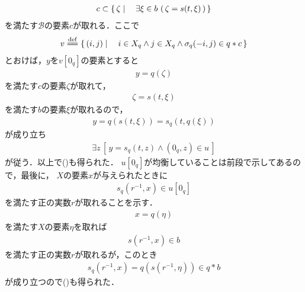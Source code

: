 \begin{sketch}
\begin{description}
\begin{align}
					c \subset \left\{\, \zeta \mid \quad \exists \xi \in b\, \left(\, \zeta = s(t,\xi)\, \right)\, \right\}
				\end{align}
				を満たす$\mathscr{B}$の要素$c$が取れる．ここで
				\begin{align}
					v \defeq \Set{(i,j)}{i \in X_q \wedge j \in X_q \wedge \sigma_q(-i,j) \in q \ast c}
				\end{align}
				とおけば，$y$を$v[0_q]$の要素とすると
				\begin{align}
					y = q(\zeta)
				\end{align}
				を満たす$c$の要素$\zeta$が取れて，
				\begin{align}
					\zeta = s(t,\xi)
				\end{align}
				を満たす$b$の要素$\xi$が取れるので，
				\begin{align}
					y = q\left(s(t,\xi)\right) = s_q\left(t,q(\xi)\right)
				\end{align}
				が成り立ち
				\begin{align}
					\exists z\, \left[\, y=s_q(t,z) \wedge (0_q,z) \in u\, \right]
				\end{align}
				が従う．以上で()も得られた．
				$u[0_q]$が均衡していることは前段で示してあるので，最後に，
				$X$の要素$x$が与えられたときに
				\begin{align}
					s_q(r^{-1},x) \in u[0_q]
					\label{fom:thm_quotient_topological_vector_space_4}
				\end{align}
				を満たす正の実数$r$が取れることを示す．
				\begin{align}
					x = q(\eta)
				\end{align}
				を満たす$X$の要素$\eta$を取れば
				\begin{align}
					s(r^{-1},x) \in b
				\end{align}
				を満たす正の実数$r$が取れるが，このとき
				\begin{align}
					s_q(r^{-1},x) = q\left(s(r^{-1},\eta)\right) \in q \ast b
				\end{align}
				が成り立つので()も得られた．
				

\end{description}
\end{sketch}
